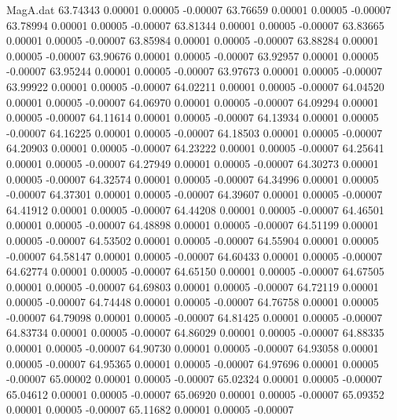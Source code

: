 \begin{filecontents}{MagA.dat}
  63.74343    0.00001    0.00005   -0.00007
  63.76659    0.00001    0.00005   -0.00007
  63.78994    0.00001    0.00005   -0.00007
  63.81344    0.00001    0.00005   -0.00007
  63.83665    0.00001    0.00005   -0.00007
  63.85984    0.00001    0.00005   -0.00007
  63.88284    0.00001    0.00005   -0.00007
  63.90676    0.00001    0.00005   -0.00007
  63.92957    0.00001    0.00005   -0.00007
  63.95244    0.00001    0.00005   -0.00007
  63.97673    0.00001    0.00005   -0.00007
  63.99922    0.00001    0.00005   -0.00007
  64.02211    0.00001    0.00005   -0.00007
  64.04520    0.00001    0.00005   -0.00007
  64.06970    0.00001    0.00005   -0.00007
  64.09294    0.00001    0.00005   -0.00007
  64.11614    0.00001    0.00005   -0.00007
  64.13934    0.00001    0.00005   -0.00007
  64.16225    0.00001    0.00005   -0.00007
  64.18503    0.00001    0.00005   -0.00007
  64.20903    0.00001    0.00005   -0.00007
  64.23222    0.00001    0.00005   -0.00007
  64.25641    0.00001    0.00005   -0.00007
  64.27949    0.00001    0.00005   -0.00007
  64.30273    0.00001    0.00005   -0.00007
  64.32574    0.00001    0.00005   -0.00007
  64.34996    0.00001    0.00005   -0.00007
  64.37301    0.00001    0.00005   -0.00007
  64.39607    0.00001    0.00005   -0.00007
  64.41912    0.00001    0.00005   -0.00007
  64.44208    0.00001    0.00005   -0.00007
  64.46501    0.00001    0.00005   -0.00007
  64.48898    0.00001    0.00005   -0.00007
  64.51199    0.00001    0.00005   -0.00007
  64.53502    0.00001    0.00005   -0.00007
  64.55904    0.00001    0.00005   -0.00007
  64.58147    0.00001    0.00005   -0.00007
  64.60433    0.00001    0.00005   -0.00007
  64.62774    0.00001    0.00005   -0.00007
  64.65150    0.00001    0.00005   -0.00007
  64.67505    0.00001    0.00005   -0.00007
  64.69803    0.00001    0.00005   -0.00007
  64.72119    0.00001    0.00005   -0.00007
  64.74448    0.00001    0.00005   -0.00007
  64.76758    0.00001    0.00005   -0.00007
  64.79098    0.00001    0.00005   -0.00007
  64.81425    0.00001    0.00005   -0.00007
  64.83734    0.00001    0.00005   -0.00007
  64.86029    0.00001    0.00005   -0.00007
  64.88335    0.00001    0.00005   -0.00007
  64.90730    0.00001    0.00005   -0.00007
  64.93058    0.00001    0.00005   -0.00007
  64.95365    0.00001    0.00005   -0.00007
  64.97696    0.00001    0.00005   -0.00007
  65.00002    0.00001    0.00005   -0.00007
  65.02324    0.00001    0.00005   -0.00007
  65.04612    0.00001    0.00005   -0.00007
  65.06920    0.00001    0.00005   -0.00007
  65.09352    0.00001    0.00005   -0.00007
  65.11682    0.00001    0.00005   -0.00007

\end{filecontents}
